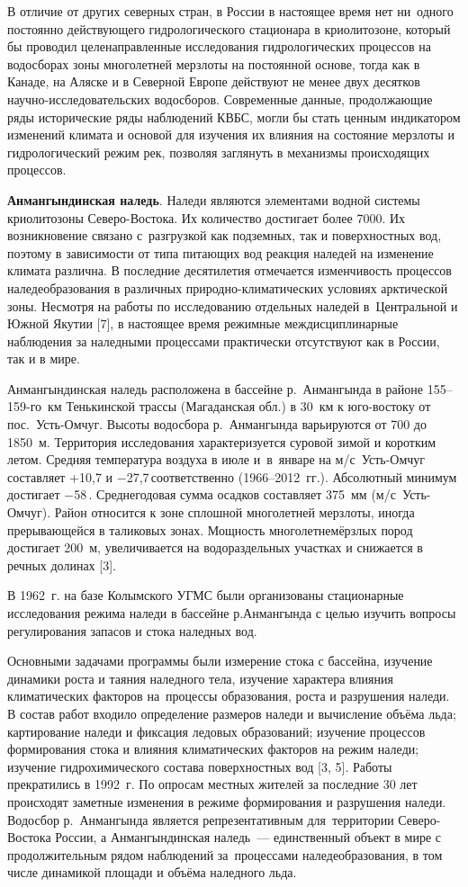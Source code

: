 В отличие от других северных стран, в России в настоящее время нет ни~одного постоянно действующего гидрологического стационара в криолитозоне, который бы проводил целенаправленные исследования гидрологических процессов на водосборах зоны многолетней мерзлоты на постоянной основе, тогда как в Канаде, на Аляске и в Северной Европе действуют не менее двух десятков научно-исследовательских водосборов. Современные данные, продолжающие ряды исторические ряды наблюдений КВБС, могли бы стать ценным индикатором изменений климата и основой для изучения их влияния на состояние мерзлоты и гидрологический режим рек, позволяя заглянуть в механизмы происходящих процессов.

\textbf{Анмангындинская наледь}. Наледи являются элементами водной системы криолитозоны Северо-Востока. Их количество достигает более 7000. Их возникновение связано с~разгрузкой как подземных, так и поверхностных вод, поэтому в зависимости от типа питающих вод реакция наледей на изменение климата различна. В последние десятилетия отмечается изменчивость процессов наледеобразования в различных природно-климатических условиях арктической зоны. Несмотря на работы по исследованию отдельных наледей в~Центральной и Южной Якутии [7], в настоящее время режимные междисциплинарные наблюдения за наледными процессами практически отсутствуют как в России, так и в мире.


Анмангындинская наледь расположена в бассейне р.~Анмангында в районе 155--159-го~км Тенькинской трассы (Магаданская обл.) в 30~км к юго-востоку от пос.~Усть-Омчуг. Высоты водосбора р.~Анмангында варьируются от 700 до 1850~м. Территория исследования характеризуется суровой зимой и коротким летом. Средняя температура воздуха в июле и~в~январе на м/с~Усть-Омчуг составляет +10,7 и $-$27,7\,\dgc соответственно (1966--2012~гг.). Абсолютный минимум достигает $-$58\,. Среднегодовая сумма осадков составляет 375~мм (м/с~Усть-Омчуг). Район относится к зоне сплошной многолетней мерзлоты, иногда прерывающейся в таликовых зонах. Мощность многолетнемёрзлых пород достигает 200~м, увеличивается на водораздельных участках и снижается в речных долинах [3].

В 1962~г. на базе Колымского УГМС были организованы стационарные исследования режима наледи в бассейне р.Анмангында с целью изучить вопросы регулирования запасов и стока наледных вод.

Основными задачами программы были измерение стока с бассейна, изучение динамики роста и таяния наледного тела, изучение характера влияния климатических факторов на~процессы образования, роста и разрушения наледи. В состав работ входило определение размеров наледи и вычисление объёма льда; картирование наледи и фиксация ледовых образований; изучение процессов формирования стока и влияния климатических факторов на режим наледи; изучение гидрохимического состава поверхностных вод [3, 5].
\clearpage
Работы прекратились в 1992~г. По опросам местных жителей за последние 30 лет происходят заметные изменения в режиме формирования и разрушения наледи. Водосбор р.~Анмангында является репрезентативным для~территории Северо-Востока России, а Анмангындинская наледь~--- единственный объект в мире с продолжительным рядом наблюдений за~процессами наледеобразования, в том числе динамикой площади и объёма наледного льда.


